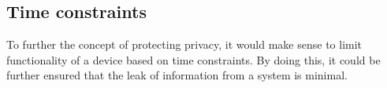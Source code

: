 \subsection{Time constraints}
To further the concept of protecting privacy, it would make sense to limit functionality of a device based on time constraints.
By doing this, it could be further ensured that the leak of information from a system is minimal.
